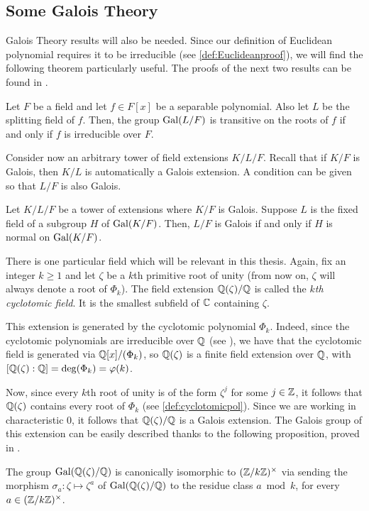 \documentclass[../main.tex]{subfiles}
\begin{document}
\subsection{Some Galois Theory}

Galois Theory results will also be needed. Since our definition of Euclidean polynomial requires it to be irreducible (see \cref{def:Euclideanproof}), we will find the following theorem particularly useful. The proofs of the next two results can be found in \cite[Chapter 6 and 7]{GaloisCox}.
\begin{theorem}\label{th:conjugatesirreduc}
	Let $F$ be a field and let $f\in F[x]$ be a separable polynomial. Also let $L$ be the splitting field of $f$. Then, the group $\operatorname{Gal}(L/F)$ is transitive on the roots of $f$ if and only if $f$ is irreducible over $F$.
\end{theorem}

Consider now an arbitrary tower of field extensions $K/L/F$. Recall that if $K/F$ is Galois, then $K/L$ is automatically a Galois extension. A condition can be given so that $L/F$ is also Galois.
\begin{theorem}\label{th:galoisextcondition}
	Let $K/L/F$ be a tower of extensions where $K/F$ is Galois. Suppose $L$ is the fixed field of a subgroup $H$ of $\operatorname{Gal}(K/F)$. Then, $L/F$ is Galois if and only if $H$ is normal on $\operatorname{Gal}(K/F)$.
\end{theorem}

There is one particular field which will be relevant in this thesis. Again, fix an integer $k\geqslant 1$ and let $\zeta$ be a $k$th primitive root of unity (from now on, $\zeta$ will always denote a root of $\Phi_k$). The field extension $\mathbb{Q}(\zeta)/\mathbb{Q}$ is called the \emph{$k$th cyclotomic field}. It is the smallest subfield of $\mathbb{C}$ containing $\zeta$. 

This extension is generated by the cyclotomic polynomial $\Phi_k$. Indeed, since the cyclotomic polynomials are irreducible over $\mathbb{Q}$ (see \cite[Chapter 9]{GaloisCox}), we have that the cyclotomic field is generated via $\mathbb{Q}[x]/(\Phi_k)$, so $\mathbb{Q}(\zeta)$ is a finite field extension over $\mathbb{Q}$, with $[\mathbb{Q}(\zeta):\mathbb{Q}]=\operatorname{deg}(\Phi_k)=\varphi(k)$.

Now, since every $k$th root of unity is of the form $\zeta^j$ for some $j\in\mathbb{Z}$, it follows that $\mathbb{Q}(\zeta)$ contains every root of $\Phi_k$ (see \cref{def:cyclotomicpol}). Since we are working in characteristic $0$, it follows that $\mathbb{Q}(\zeta)/\mathbb{Q}$ is a Galois extension. The Galois group of this extension can be easily described thanks to the following proposition, proved in \cite[Chapter 9]{GaloisCox}.
\begin{proposition}\label{prop:Galisominteg}
	The group $\operatorname{Gal}(\mathbb{Q}(\zeta)/\mathbb{Q})$ is canonically isomorphic to $(\mathbb{Z}/k\mathbb{Z})^\times$ via sending the morphism $\sigma_a:\zeta\mapsto\zeta^a$ of $\operatorname{Gal}(\mathbb{Q}(\zeta)/\mathbb{Q})$ to the residue class $a \bmod{k}$, for every $a\in(\mathbb{Z}/k\mathbb{Z})^\times$.
\end{proposition}
\end{document}
